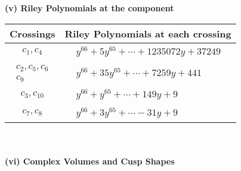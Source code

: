 \documentclass[1p]{elsarticle_modified}
\theoremstyle{definition}
\begin{document}
\newpage\renewcommand{\arraystretch}{1}
\flushleft \textbf{(v) Riley Polynomials at the component}\newline \\
\begin{tabular}{m{50pt}|m{274pt}}
Crossings & \hspace{64pt}Riley Polynomials at each crossing \\
\hline $$\begin{aligned}c_{1},c_{4}\end{aligned}$$&$\begin{aligned}
&y^{66}+5 y^{65}+\cdots+1235072 y+37249
\end{aligned}$\\
\hline $$\begin{aligned}c_{2},c_{5},c_{6}\\c_{9}\end{aligned}$$&$\begin{aligned}
&y^{66}+35 y^{65}+\cdots+7259 y+441
\end{aligned}$\\
\hline $$\begin{aligned}c_{3},c_{10}\end{aligned}$$&$\begin{aligned}
&y^{66}+y^{65}+\cdots+149 y+9
\end{aligned}$\\
\hline $$\begin{aligned}c_{7},c_{8}\end{aligned}$$&$\begin{aligned}
&y^{66}+3 y^{65}+\cdots-31 y+9
\end{aligned}$\\
\hline
\end{tabular}\\~\\
\newpage\flushleft \textbf{(vi) Complex Volumes and Cusp Shapes}
\end{document}
